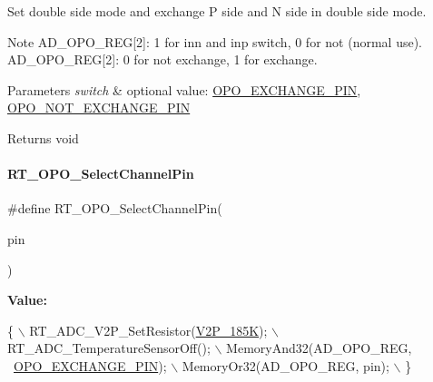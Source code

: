 Set double side mode and exchange P side and N side in double side mode. 

\begin{DoxyNote}{Note}
A\+D\+\_\+\+O\+P\+O\+\_\+\+R\+EG\mbox{[}2\mbox{]}\+: 1 for inn and inp switch, 0 for not (normal use). A\+D\+\_\+\+O\+P\+O\+\_\+\+R\+EG\mbox{[}2\mbox{]}\+: 0 for not exchange, 1 for exchange. 
\end{DoxyNote}

\begin{DoxyParams}{Parameters}
{\em switch} & optional value\+: \mbox{\hyperlink{a00002_af0663f5e9fee7a904ad95d1a4ecdaebda8866b250a87989e76add11875358e4ae}{O\+P\+O\+\_\+\+E\+X\+C\+H\+A\+N\+G\+E\+\_\+\+P\+IN}}, \mbox{\hyperlink{a00002_af0663f5e9fee7a904ad95d1a4ecdaebda4c251187b10da59c8696dbf4951b49d3}{O\+P\+O\+\_\+\+N\+O\+T\+\_\+\+E\+X\+C\+H\+A\+N\+G\+E\+\_\+\+P\+IN}} \\
\hline
\end{DoxyParams}
\begin{DoxyReturn}{Returns}
void 
\end{DoxyReturn}
\mbox{\label{a00002_aaa7081959e37104e40e3f637d42d5144}} 
\paragraph{\texorpdfstring{R\+T\+\_\+\+O\+P\+O\+\_\+\+Select\+Channel\+Pin}{RT\_OPO\_SelectChannelPin}}
{\footnotesize\ttfamily \#define R\+T\+\_\+\+O\+P\+O\+\_\+\+Select\+Channel\+Pin(\begin{DoxyParamCaption}\item[{}]{pin }\end{DoxyParamCaption})}

{\bfseries Value\+:}
\begin{DoxyCode}
\{                                               \(\backslash\)
        RT\_ADC\_V2P\_SetResistor(\mbox{\hyperlink{a00002_a80255c41c3764feff9b79664f15feb46aa035ba8725fe8565c5505a295c22ea8e}{V2P\_185K}});           \(\backslash\)
        RT\_ADC\_TemperatureSensorOff();              \(\backslash\)
        MemoryAnd32(AD\_OPO\_REG, ~\mbox{\hyperlink{a00002_af0663f5e9fee7a904ad95d1a4ecdaebda8866b250a87989e76add11875358e4ae}{OPO\_EXCHANGE\_PIN}}); \(\backslash\)
        MemoryOr32(AD\_OPO\_REG, pin);                \(\backslash\)
    \}
\end{DoxyCode}


